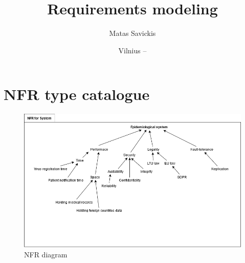 \documentclass{VUMIFPSkursinis}
\title{Requirements modeling}
\author{Matas Savickis}
\date{Vilnius – \the\year}
\begin{document}
\maketitle

\tableofcontents

\section{NFR type catalogue}

\begin{figure}[htbp]
	\includegraphics[scale=0.6]{img/1}
	\caption{NFR diagram} %
	\label{img:kurimoProcesas}
\end{figure}
\end{document}
